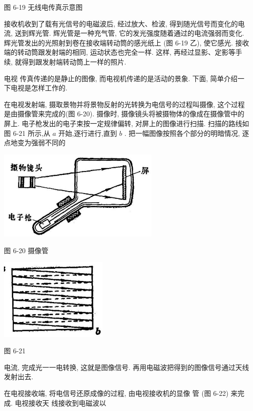 \documentclass[10pt]{article}
\begin{document}
图 6-19 无线电传真示意图

接收机收到了载有光信号的电磁波后, 经过放大、检波, 得到随光信号而变化的电流, 送到辉光管. 辉光管是一种充气管, 它的发光强度随着通过的电流强弱而变化. 辉光管发出的光照射到卷在接收端转动筒的感光纸上 (图 6-19 乙), 使它感光. 接收端的转动筒跟发射端的相同, 运动状态也完全一样. 这样, 再经过显影、定影等手续, 就得到跟发射端转动筒上一样的照片.

电视 传真传递的是静止的图像, 而电视机传递的是活动的景象. 下面, 简单介绍一下电视是怎样工作的.

在电视发射端, 摄取景物并将景物反射的光转换为电信号的过程叫摄像, 这个过程是由摄像管来完成的(图 6-20). 摄像时, 摄像镜头将被摄物体的像成在摄像管中的屏上. 电子枪发出的电子束按一定规律偏转, 对屏上的图像进行扫描. 扫描的路线如图 6-21 所示,从 \(a\) 开始,逐行进行,直到 \(b\) . 把一幅图像按照各个部分的明暗情况, 逐点地变为强弱不同的

\begin{center}
\includegraphics[max width=0.6\textwidth]{images/01913056-1f15-74d8-9184-9aab52c9d66b_214_949949.jpg}
\end{center}

图 6-20 摄像管

\begin{center}
\includegraphics[max width=0.4\textwidth]{images/01913056-1f15-74d8-9184-9aab52c9d66b_214_665872.jpg}
\end{center}

图 6-21

电流, 完成光一一电转换, 这就是图像信号. 再用电磁波把得到的图像信号通过天线发射出去.

在电视接收端, 将电信号还原成像的过程, 由电视接收机的显像 管 (图 6-22) 来完成. 电视接收天 线接收到电磁波以
\end{document}
